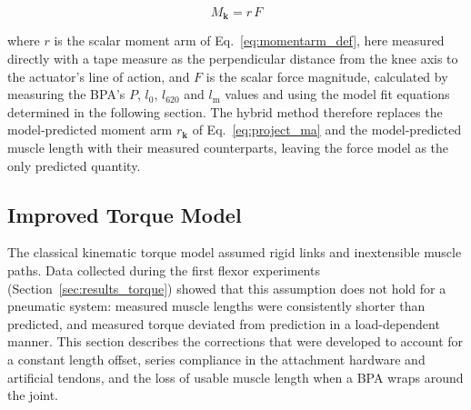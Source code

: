 \begin{equation}
    M_{\mathbf{k}} = r\,F \label{eq:M_scalar}
\end{equation}

where $r$ is the scalar moment arm of Eq.~\eqref{eq:momentarm_def}, here measured directly with a tape measure as the perpendicular distance from the knee axis to the actuator's line of action, and $F$ is the scalar force magnitude, calculated by measuring the BPA's $P$, $l_{0}$, $l_{620}$ and $l_\text{m}$ values and using the model fit equations determined in the following section. The hybrid method therefore replaces the model-predicted moment arm $r_{\mathbf{k}}$ of Eq.~\eqref{eq:project_ma} and the model-predicted muscle length with their measured counterparts, leaving the force model as the only predicted quantity.

\subsection{Improved Torque Model}\label{sec:improved_model}

The classical kinematic torque model assumed rigid links and inextensible muscle paths. Data collected during the first flexor experiments (Section~\ref{sec:results_torque}) showed that this assumption does not hold for a pneumatic system: measured muscle lengths were consistently shorter than predicted, and measured torque deviated from prediction in a load-dependent manner. This section describes the corrections that were developed to account for a constant length offset, series compliance in the attachment hardware and artificial tendons, and the loss of usable muscle length when a BPA wraps around the joint.

